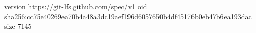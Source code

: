 version https://git-lfs.github.com/spec/v1
oid sha256:cc75e40269ea70b4a48a3dc19aef196d6057650b4df45176b0eb47b6ea193dac
size 7145
